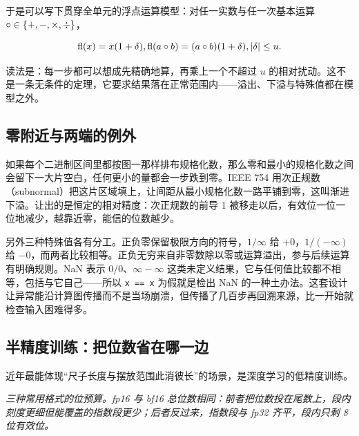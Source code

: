 于是可以写下贯穿全单元的浮点运算模型：对任一实数与任一次基本运算 \(\circ\in\left\{+,-,\times,\div\right\}\)，

\[
\operatorname{fl}(x)=x(1+\delta),\space
\operatorname{fl}(a\circ b)=(a\circ b)(1+\delta),\space \left|\delta\right|\le u.
\]

读法是：每一步都可以想成先精确地算，再乘上一个不超过 \(u\) 的相对扰动。这不是一条无条件的定理，它要求结果落在正常范围内——溢出、下溢与特殊值都在模型之外。

\subsection{零附近与两端的例外}

如果每个二进制区间里都按图一那样排布规格化数，那么零和最小的规格化数之间会留下一大片空白，任何更小的量都会一步跌到零。IEEE 754 用次正规数（subnormal）把这片区域填上，让间距从最小规格化数一路平铺到零，这叫渐进下溢。让出的是恒定的相对精度：次正规数的前导 1 被移走以后，有效位一位一位地减少，越靠近零，能信的位数越少。

另外三种特殊值各有分工。正负零保留极限方向的符号，\(1/\infty\) 给 \(+0\)，\(1/(-\infty)\) 给 \(-0\)，而两者比较相等。正负无穷来自非零数除以零或运算溢出，参与后续运算有明确规则。NaN 表示 \(0/0\)、\(\infty-\infty\) 这类未定义结果，它与任何值比较都不相等，包括与它自己——所以 \texttt{x == x} 为假就是检出 NaN 的一种土办法。这套设计让异常能沿计算图传播而不是当场崩溃，但传播了几百步再回溯来源，比一开始就检查输入困难得多。

\subsection{半精度训练：把位数省在哪一边}

近年最能体现``尺子长度与摆放范围此消彼长''的场景，是深度学习的低精度训练。

\begin{center}

\emph{三种常用格式的位预算。fp16 与 bf16 总位数相同：前者把位数投在尾数上，段内刻度更细但能覆盖的指数段更少；后者反过来，指数段与 fp32 齐平，段内只剩 8 位有效位。}
\end{center}

